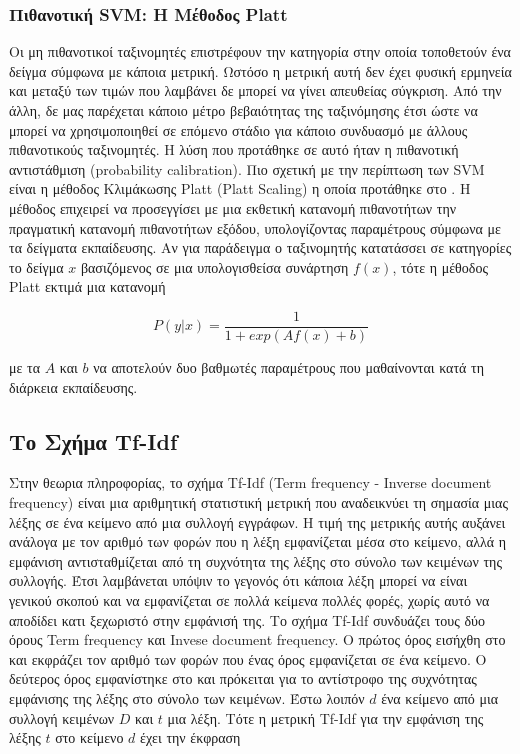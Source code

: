 \documentclass[11pt,a4paper,english,greek,twoside]{../Thesis}
\begin{document}
\subsubsection{Πιθανοτική SVM: Η Μέθοδος Platt}
Οι μη πιθανοτικοί ταξινομητές επιστρέφουν την κατηγορία στην οποία τοποθετούν ένα δείγμα σύμφωνα με κάποια μετρική. Ωστόσο η μετρική αυτή δεν έχει φυσική ερμηνεία και μεταξύ των τιμών που λαμβάνει δε μπορεί να γίνει απευθείας σύγκριση. Από την άλλη, δε μας παρέχεται κάποιο μέτρο βεβαιότητας της ταξινόμησης έτσι ώστε να μπορεί να χρησιμοποιηθεί σε επόμενο στάδιο για κάποιο συνδυασμό με άλλους πιθανοτικούς ταξινομητές. Η λύση που προτάθηκε σε αυτό ήταν η πιθανοτική αντιστάθμιση (probability calibration). Πιο σχετική με την περίπτωση των SVM είναι η μέθοδος Κλιμάκωσης Platt (Platt Scaling) η οποία προτάθηκε στο \cite{platt_1999}. Η μέθοδος επιχειρεί να προσεγγίσει με μια εκθετική κατανομή πιθανοτήτων την πραγματική κατανομή πιθανοτήτων εξόδου, υπολογίζοντας παραμέτρους σύμφωνα με τα δείγματα εκπαίδευσης. Αν για παράδειγμα ο ταξινομητής κατατάσσει σε κατηγορίες το δείγμα $x$ βασιζόμενος σε μια υπολογισθείσα συνάρτηση $f(x)$, τότε η μέθοδος Platt εκτιμά μια κατανομή

\begin{equation}\label{eq:Platt}
    P(y|x)=\frac{1}{1+exp(Af(x)+b)}
\end{equation}

με τα $A$ και $b$ να αποτελούν δυο βαθμωτές παραμέτρους που μαθαίνονται κατά τη διάρκεια εκπαίδευσης.


\subsection{Το Σχήμα Tf-Idf}
Στην θεωρια πληροφορίας, το σχήμα Tf-Idf (Term frequency - Inverse document frequency) είναι μια αριθμητική στατιστική μετρική που αναδεικνύει τη σημασία μιας λέξης σε ένα κείμενο από μια συλλογή εγγράφων. Η τιμή της μετρικής αυτής αυξάνει ανάλογα με τον αριθμό των φορών που η λέξη εμφανίζεται μέσα στο κείμενο, αλλά η εμφάνιση αντισταθμίζεται από τη συχνότητα της λέξης στο σύνολο των κειμένων της συλλογής. Έτσι λαμβάνεται υπόψιν το γεγονός ότι κάποια λέξη μπορεί να είναι γενικού σκοπού και να εμφανίζεται σε πολλά κείμενα πολλές φορές, χωρίς αυτό να αποδίδει κατι ξεχωριστό στην εμφάνισή της. Το σχήμα Tf-Idf συνδυάζει τους δύο όρους Term frequency και Invese document frequency. Ο πρώτος όρος εισήχθη στο \cite{luhn_1957} και εκφράζει τον αριθμό των φορών που ένας όρος εμφανίζεται σε ένα κείμενο. Ο δεύτερος όρος εμφανίστηκε στο \cite{jones_1972} και πρόκειται για το αντίστροφο της συχνότητας εμφάνισης της λέξης στο σύνολο των κειμένων. Έστω λοιπόν $d$ ένα κείμενο από μια συλλογή κειμένων $D$ και $t$ μια λέξη. Τότε η μετρική Tf-Idf για την εμφάνιση της λέξης $t$ στο κείμενο $d$ έχει την έκφραση
\end{document}
